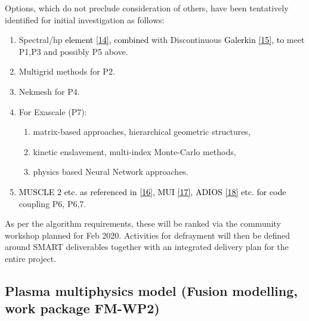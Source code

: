 \documentclass[a4paper]{article}
\newcommand\textstyleInternetlink[1]{\textcolor{blue}{#1}}
\newcommand\liststyleWWNumix{%
\renewcommand\theenumi{\arabic{enumi}}
\renewcommand\theenumii{\alph{enumii}}
\renewcommand\labelenumi{\theenumi.}
\renewcommand\labelenumii{\theenumii.}
\renewcommand\labelitemi{[F0A7?]}
\renewcommand\labelitemii{[F0B7?]}
}
\begin{document}
\bigskip

Options, which do not preclude consideration of others, have been tentatively identified for initial investigation as
follows:


\bigskip

\liststyleWWNumix
\begin{enumerate}
\item Spectral/hp \textcolor{black}{element
}\href{https://en.wikipedia.org/wiki/Spectral_element_method}{\textstyleInternetlink{\textcolor{black}{[14]}}}\textcolor{black}{,
combined }with Discontinuous \textcolor{black}{Galerkin
}\href{https://www.sciencedirect.com/topics/engineering/discontinuous-galerkin}{\textstyleInternetlink{\textcolor{black}{[15]}}}\textcolor{black}{,
to }meet P1,P3 and possibly P5 above.
\item Multigrid methods for P2.
\item Nekmesh for P4.
\item For Exascale (P7):

\begin{enumerate}
\item matrix-based approaches, hierarchical geometric structures,
\item kinetic enslavement, multi-index Monte-Carlo methods,
\item physics based Neural Network approaches.
\end{enumerate}
\item \textcolor{black}{MUSCLE 2 etc. as referenced in
}\href{https://royalsocietypublishing.org/doi/10.1098/rsta.2018.0144}{\textstyleInternetlink{\textcolor{black}{[16]}}}\textcolor{black}{,
MUI
}\href{https://www.sciencedirect.com/science/article/pii/S0021999115003228}{\textstyleInternetlink{\textcolor{black}{[17]}}}\textcolor{black}{,
ADIOS
}\href{https://www.olcf.ornl.gov/center-projects/adios/}{\textstyleInternetlink{\textcolor{black}{[18]}}}\textcolor{black}{
etc. for code }coupling P6, P6,7.
\end{enumerate}

\bigskip

As per the algorithm requirements, these will be ranked via the community workshop planned for Feb 2020. Activities for
defrayment will then be defined around SMART deliverables together with an integrated delivery plan for the entire
project.


\bigskip

\subsection[Plasma multiphysics model (Fusion modelling, work package
FM{}-WP2)]{\textbf{\textcolor[rgb]{0.12156863,0.28627452,0.49019608}{Plasma multiphysics
model}}\textcolor[rgb]{0.12156863,0.28627452,0.49019608}{ }\textcolor[rgb]{0.12156863,0.28627452,0.49019608}{(Fusion
modelling, work package
}\textbf{\textcolor[rgb]{0.12156863,0.28627452,0.49019608}{FM-WP2}}\textcolor[rgb]{0.12156863,0.28627452,0.49019608}{)}}
\end{document}
